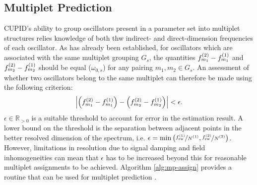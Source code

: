 \subsection{Multiplet Prediction}
\label{subsec:mp-selection}
\ac{CUPID}'s ability to group oscillators present in a parameter set into
multiplet structures relies knowledge of both thw indirect- and
direct-dimension frequencies of each oscillator. As has already been
established, for oscillators which are associated with the same multiplet
grouping $G_s$, the quantities $f^{(2)}_{m_1} - f^{(1)}_{m_1}$ and $f^{(2)}_{m_2} -
f^{(1)}_{m_2}$ should be equal ($\omega_{0,s}$) for any pairing  $m_1, m_2 \in
G_s$. An assessment of whether two oscillators belong to the same multiplet can
therefore be made using the following criterion:
\begin{equation}
    \left \lvert
        \left( f^{(2)}_{m_1} - f^{(1)}_{m_1} \right) -
        \left( f^{(2)}_{m_2} - f^{(1)}_{m_2} \right)
    \right \rvert < \epsilon.
\end{equation}
$\epsilon \in \mathbb{R}_{>0}$ is a suitable threshold to account for error in
the estimation result. A lower bound on the threshold is the separation between
adjacent points in the better resolved dimension of the spectrum, i.e.
$\epsilon = \min\left(\nicefrac{\fswone}{\None},
\nicefrac{\fswtwo}{\Ntwo}\right)$.  However, limitations in resolution due to
signal damping and field inhomogeneities can mean that $\epsilon$ has to be
increased beyond this for reasonable multiplet assignments to be achieved.
Algorithm \ref{alg:mp-assign} provides a routine that can be used for multiplet
prediction .

